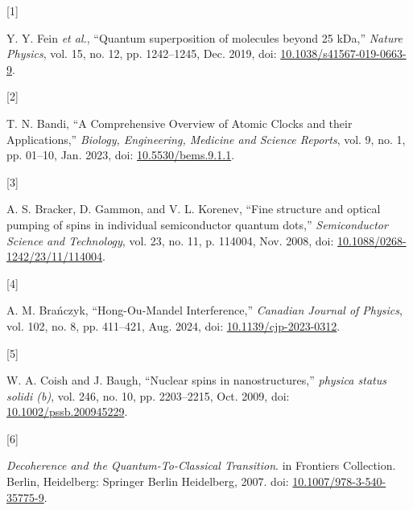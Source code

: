 \documentclass[
]{article}
\newlength{\cslhangindent}
\newlength{\csllabelwidth}
\newenvironment{CSLReferences}[2] %
 {\begin{list}{}{%
  \setlength{\itemindent}{0pt}
  \setlength{\leftmargin}{0pt}
  \setlength{\parsep}{0pt}
  \ifodd #1
   \setlength{\leftmargin}{\cslhangindent}
   \setlength{\itemindent}{-1\cslhangindent}
  \fi
  \setlength{\itemsep}{#2\baselineskip}}}
 {\end{list}}
\newcommand{\CSLLeftMargin}[1]{\parbox[t]{\csllabelwidth}{\strut#1\strut}}
\newcommand{\CSLRightInline}[1]{\parbox[t]{\linewidth - \csllabelwidth}{\strut#1\strut}}
\begin{document}
\protect{}\label{refs}
\begin{CSLReferences}{0}{0}
\CSLLeftMargin{{[}1{]} }%
\CSLRightInline{Y. Y. Fein \emph{et al.}, {``Quantum superposition of
molecules beyond 25 {kDa},''} \emph{Nature Physics}, vol. 15, no. 12,
pp. 1242--1245, Dec. 2019, doi:
\href{https://doi.org/10.1038/s41567-019-0663-9}{10.1038/s41567-019-0663-9}.}

\CSLLeftMargin{{[}2{]} }%
\CSLRightInline{T. N. Bandi, {``A {Comprehensive Overview} of {Atomic
Clocks} and their {Applications},''} \emph{Biology, Engineering,
Medicine and Science Reports}, vol. 9, no. 1, pp. 01--10, Jan. 2023,
doi: \href{https://doi.org/10.5530/bems.9.1.1}{10.5530/bems.9.1.1}.}

\CSLLeftMargin{{[}3{]} }%
\CSLRightInline{A. S. Bracker, D. Gammon, and V. L. Korenev, {``Fine
structure and optical pumping of spins in individual semiconductor
quantum dots,''} \emph{Semiconductor Science and Technology}, vol. 23,
no. 11, p. 114004, Nov. 2008, doi:
\href{https://doi.org/10.1088/0268-1242/23/11/114004}{10.1088/0268-1242/23/11/114004}.}

\CSLLeftMargin{{[}4{]} }%
\CSLRightInline{A. M. Brańczyk, {``Hong-{Ou-Mandel Interference},''}
\emph{Canadian Journal of Physics}, vol. 102, no. 8, pp. 411--421, Aug.
2024, doi:
\href{https://doi.org/10.1139/cjp-2023-0312}{10.1139/cjp-2023-0312}.}

\CSLLeftMargin{{[}5{]} }%
\CSLRightInline{W. A. Coish and J. Baugh, {``Nuclear spins in
nanostructures,''} \emph{physica status solidi (b)}, vol. 246, no. 10,
pp. 2203--2215, Oct. 2009, doi:
\href{https://doi.org/10.1002/pssb.200945229}{10.1002/pssb.200945229}.}

\CSLLeftMargin{{[}6{]} }%
\CSLRightInline{\emph{Decoherence and the {Quantum-To-Classical
Transition}}. in Frontiers {Collection}. Berlin, Heidelberg: Springer
Berlin Heidelberg, 2007. doi:
\href{https://doi.org/10.1007/978-3-540-35775-9}{10.1007/978-3-540-35775-9}.}

\end{CSLReferences}
\end{document}
